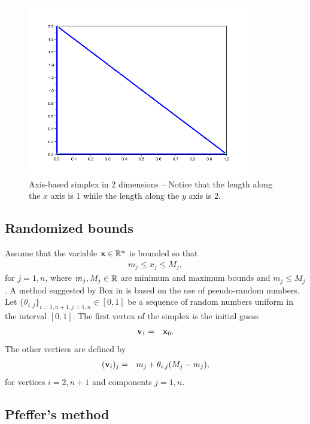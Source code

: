 \begin{figure}
\begin{center}
\includegraphics[width=10cm]{simplex_axes.png}
\end{center}
\caption{Axis-based simplex in 2 dimensions -- Notice that the length along the $x$ axis is 1 while the length
along the $y$ axis is 2. }
\label{fig-nm-simplex-axes}
\end{figure}

\subsection{Randomized bounds}

Assume that the variable $\mathbf{x}\in\mathbb{R}^n$ is bounded so that 
\begin{eqnarray}
m_j \leq x_j \leq M_j,
\end{eqnarray}
for $j=1,n$, where $m_j,M_j\in\mathbb{R}$ are minimum 
and maximum bounds and $m_j\leq M_j$.
A method suggested by Box in \cite{Box1965} is 
based on the use of 
pseudo-random numbers. Let 
$\{\theta_{i,j}\}_{i=1,n+1,j=1,n}\in[0,1]$ be 
a sequence of random numbers uniform in the 
interval $[0,1]$.
The first vertex of the simplex is the initial guess 
\begin{eqnarray}
\mathbf{v}_1 &=& \mathbf{x}_0.
\end{eqnarray}
The other vertices are defined by 
\begin{eqnarray}
(\mathbf{v}_i)_j &=& m_j + \theta_{i,j} (M_j - m_j),
\end{eqnarray}
for vertices $i=2,n+1$ and components $j=1,n$.

\subsection{Pfeffer's method}

